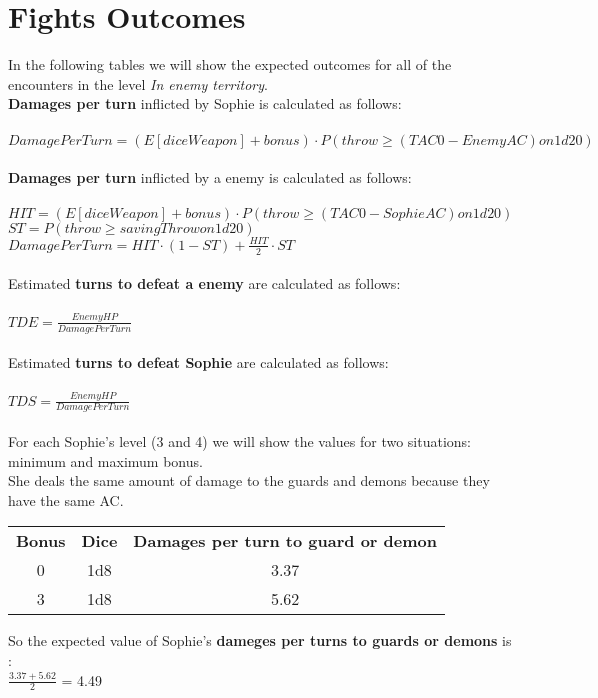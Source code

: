 \section{Fights Outcomes}
In the following tables we will show the expected outcomes for all of the encounters in the level \textit{In enemy territory}. \\
\textbf{Damages per turn} inflicted by Sophie is calculated as follows:\\\\
$DamagePerTurn=(E[diceWeapon] + bonus) \cdot P(throw \ge (TAC0 - EnemyAC) on 1d20)$\\\\
\textbf{Damages per turn} inflicted by a enemy is calculated as follows:\\\\
$HIT=(E[diceWeapon] + bonus) \cdot P(throw \ge (TAC0 - SophieAC) on 1d20)$\\
$ST=P(throw \ge savingThrow on 1d20)$\\
$DamagePerTurn=HIT \cdot (1-ST)+\frac{HIT}{2} \cdot ST$\\\\
Estimated \textbf{turns to defeat a enemy} are calculated as follows:\\\\
$TDE=\frac{EnemyHP}{DamagePerTurn}$\\\\
Estimated \textbf{turns to defeat Sophie} are calculated as follows:\\\\
$TDS=\frac{EnemyHP}{DamagePerTurn}$\\\\
For each Sophie's level (3 and 4) we will show the values for two situations: minimum and maximum bonus.\\
She deals the same amount of damage to the guards and demons because they have the same AC.
\begin{table}[H]
  \centering
  \begin{tabular}{|c|c|c|}
    \hline
    \rowcolor[HTML]{9B9B9B}
    \multicolumn{3}{|c|}{\cellcolor[HTML]{9B9B9B}{\color[HTML]{FFFFFF} \textbf{Sophie}}} \\ \hline
    \rowcolor[HTML]{C0C0C0}
    \textbf{Bonus} & \textbf{Dice} & \textbf{Damages per turn to guard or demon} \\ \hline
    0 & 1d8 & 3.37 \\ \hline
    3 & 1d8 & 5.62 \\ \hline
  \end{tabular}
\end{table}
So the expected value of Sophie's \textbf{dameges per turns to guards or demons} is :\\
$\frac{3.37+5.62}{2}$ = 4.49\\

